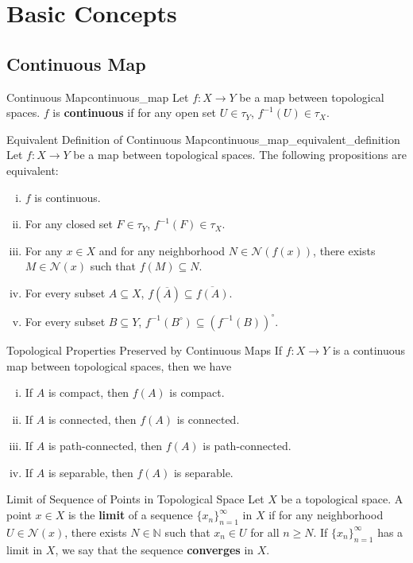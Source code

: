 \documentclass{report}
\begin{document}
\section{Basic Concepts}
\subsection{Continuous Map}

\begin{definition}{Continuous Map}{continuous_map}
	Let $f:X\to Y$ be a map between topological spaces. $f$ is \textbf{continuous} if for any open set $U\in\tau_Y$, $f^{-1}(U)\in\tau_X$.
\end{definition}

\begin{proposition}{Equivalent Definition of Continuous Map}{continuous_map_equivalent_definition}
	Let $f:X\to Y$ be a map between topological spaces. The following propositions are equivalent:
	\begin{enumerate}[(i)]
		\item $f$ is continuous.
		\item For any closed set $F\in\tau_Y$, $f^{-1}(F)\in\tau_X$.
		\item For any $x\in X$ and for any neighborhood $N\in\mathcal{N}(f(x))$, there exists $M\in\mathcal{N}(x)$ such that $f(M)\subseteq N$.
		\item For every subset $A\subseteq X$, $f(\overline{A})\subseteq \overline{f(A)}$.
		\item For every subset $B\subseteq Y$, $f^{-1}(B^\circ)\subseteq (f^{-1}(B))^\circ$.
	\end{enumerate}
\end{proposition}

\begin{definition}{Topological Properties Preserved by Continuous Maps}{}
	If $f:X\to Y$ is a continuous map between topological spaces, then we have
	\begin{enumerate}[(i)]
		\item If $A$ is compact, then $f(A)$ is compact.
		\item If $A$ is connected, then $f(A)$ is connected.
		\item If $A$ is path-connected, then $f(A)$ is path-connected.
		\item If $A$ is separable, then $f(A)$ is separable.
	\end{enumerate}
\end{definition}

\begin{definition}{Limit of Sequence of Points in Topological Space}{}
	Let $X$ be a topological space. A point $x\in X$ is the \textbf{limit} of a sequence $\{x_n\}_{n=1}^\infty$ in $X$ if for any neighborhood $U\in\mathcal{N}(x)$, there exists $N\in\mathbb{N}$ such that $x_n\in U$ for all $n\ge N$. If $\{x_n\}_{n=1}^\infty$ has a limit in $X$, we say that the sequence \textbf{converges} in $X$.
\end{definition}
\end{document}
